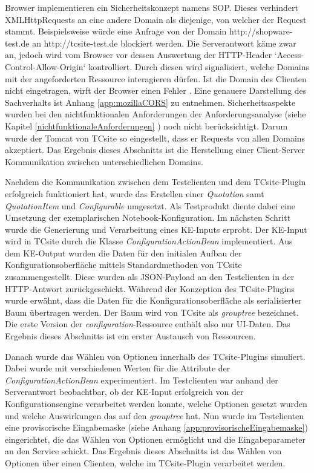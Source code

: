 \documentclass[11pt, a4paper, titlepage, listof=totoc, bibliography=totoc, index=totoc, twoside, openright, headings=normal]{scrreprt}
\begin{document}
Browser implementieren ein Sicherheitskonzept namens \ac{SOP}. Dieses verhindert XMLHttpRequests an eine andere Domain als diejenige, von welcher der Request stammt. Beispielsweise würde eine Anfrage von der Domain \glqq http://shopware-test.de\grqq{} an \glqq http://tcsite-test.de\grqq{} blockiert werden. Die Serverantwort käme zwar an, jedoch wird vom Browser vor dessen Auswertung der HTTP-Header ‘Access-Control-Allow-Origin‘ kontrolliert. Durch diesen wird signalisiert, welche Domains mit der angeforderten Ressource interagieren dürfen. Ist die Domain des Clienten nicht eingetragen, wirft der Browser einen Fehler \citep{mozillaCORS}. Eine genauere Darstellung des Sachverhalts ist Anhang \ref{app:mozillaCORS} zu entnehmen. Sicherheitsaspekte wurden bei den nichtfunktionalen Anforderungen der Anforderungsanalyse (siehe Kapitel \ref{nichtfunktionaleAnforderungen}
) noch nicht berücksichtigt. Darum wurde der Tomcat von TCsite so eingestellt, dass er Requests von allen Domains akzeptiert. Das Ergebnis dieses Abschnitts ist die Herstellung einer Client-Server Kommunikation zwischen unterschiedlichen Domains.

Nachdem die Kommunikation zwischen dem Testclienten und dem TCsite-Plugin erfolgreich funktioniert hat, wurde das Erstellen einer \emph{Quotation} samt \emph{QuotationItem} und \emph{Configurable} umgesetzt. Als Testprodukt diente dabei eine Umsetzung der exemplarischen Notebook-Konfiguration. Im nächsten Schritt wurde die Generierung und Verarbeitung eines KE-Inputs erprobt. Der KE-Input wird in TCsite durch die Klasse \emph{ConfigurationActionBean} implementiert. Aus dem KE-Output wurden die Daten für den initialen Aufbau der Konfigurationsoberfläche mittels Standardmethoden von TCsite zusammengestellt. Diese wurden als JSON-Payload an den Testclienten in der HTTP-Antwort zurückgeschickt. Während der Konzeption des TCsite-Plugins wurde erwähnt, dass die Daten für die Konfigurationsoberfläche als serialisierter Baum übertragen werden. Der Baum wird von TCsite als \emph{grouptree} bezeichnet. Die erste Version der \emph{configuration}-Ressource enthält also nur UI-Daten. Das Ergebnis dieses Abschnitts ist ein erster Austausch von Ressourcen.

Danach wurde das Wählen von Optionen innerhalb des TCsite-Plugins simuliert. Dabei wurde mit verschiedenen Werten für die Attribute der \emph{ConfigurationActionBean} experimentiert. Im Testclienten war anhand der Serverantwort beobachtbar, ob der KE-Input erfolgreich von der Konfigurationsengine verarbeitet werden konnte, welche Optionen gesetzt wurden und welche Auswirkungen das auf den \emph{grouptree} hat. Nun wurde im Testclienten eine provisorische Eingabemaske (siehe Anhang \ref{app:provisorischeEingabemaske}) eingerichtet, die das Wählen von Optionen ermöglicht und die Eingabeparameter an den Service schickt. Das Ergebnis dieses Abschnitts ist das Wählen von Optionen über einen Clienten, welche im TCsite-Plugin verarbeitet werden.
\end{document}

